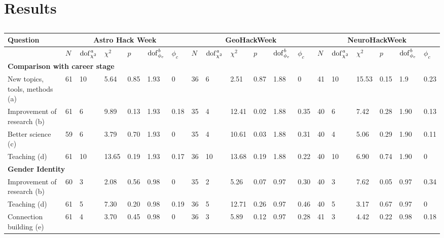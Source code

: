 \section*{Results}

\begin{table}
\footnotesize
\caption{}
\begin{threeparttable} 
\begin{tabularx}{18cm}{p{3.4cm}p{0.3cm}p{0.33cm}p{0.33cm}p{0.33cm}p{0.33cm}p{0.33cm}p{0.33cm}p{0.33cm}p{0.33cm}p{0.33cm}p{0.33cm}p{0.33cm}p{0.33cm}p{0.33cm}p{0.33cm}p{0.33cm}p{0.33cm}p{0.33cm}}
\toprule
\textbf{Question} & \multicolumn{6}{c}{\textbf{Astro Hack Week}} & \multicolumn{6}{c}{\textbf{GeoHackWeek}} & \multicolumn{6}{c}{\textbf{NeuroHackWeek}} \\ \midrule
 & $N$ & $\mathrm{dof}_{\chi^2}^\emph{a}$ & $\chi^2$ & $p$ & $\mathrm{dof}_{\phi_c}^\emph{b}$ & $\phi_c$ & $N$ & $\mathrm{dof}_{\chi^2}^\emph{a}$ & $\chi^2$ & $p$ & $\mathrm{dof}_{\phi_c}^\emph{b}$ & $\phi_c$ & $N$ & $\mathrm{dof}_{\chi^2}^\emph{a}$ & $\chi^2$ & $p$ & $\mathrm{dof}_{\phi_c}^\emph{b}$ & $\phi_c$ \\ \midrule
\multicolumn{16}{l}{\textbf{Comparison with career stage}}  \\ \midrule
New topics, tools, methods (a) & 61 & 10 & 5.64 & 0.85 & 1.93 & 0 & 36 & 6 & 2.51 & 0.87 & 1.88 & 0 & 41& 10 & 15.53 & 0.15 & 1.9 & 0.23 \\
Improvement of research (b) & 61 & 6 &  9.89 & 0.13 & 1.93 & 0.18 & 35 & 4 & 12.41 & 0.02 & 1.88 & 0.35 & 40 & 6 & 7.42 & 0.28 & 1.90 & 0.13 \\
Better science (c) & 59 & 6 & 3.79 & 0.70 & 1.93 & 0 & 35 & 4 & 10.61 & 0.03 & 1.88 & 0.31 & 40 & 4 &  5.06 & 0.29 & 1.90 & 0.11\\ 
Teaching (d) & 61 & 10 & 13.65 & 0.19 & 1.93 & 0.17 & 36 & 10 & 13.68 & 0.19 & 1.88 & 0.22 & 40 & 10 & 6.90 & 0.74 & 1.90 & 0 \\ \midrule
\multicolumn{16}{l}{\textbf{Gender Identity}} \\ \midrule
Improvement of research (b) & 60 & 3 & 2.08 & 0.56 & 0.98 & 0 & 35 & 2 & 5.26 & 0.07 & 0.97 & 0.30 & 40 & 3 & 7.62 & 0.05 & 0.97 & 0.34\\
Teaching (d) & 61 & 5 & 7.30 & 0.20 & 0.98 & 0.19 & 36 & 5 & 12.71 & 0.26 & 0.97 & 0.46 & 40 &5 & 3.17 & 0.67 & 0.97 & 0 \\
Connection building (e) & 61 & 4 & 3.70 & 0.45 & 0.98 & 0 & 36 & 3 & 5.89 & 0.12 & 0.97 & 0.28 & 41 & 3 & 4.42 & 0.22 & 0.98 & 0.18\\

\end{tabularx}
\end{threeparttable}
\end{table}
